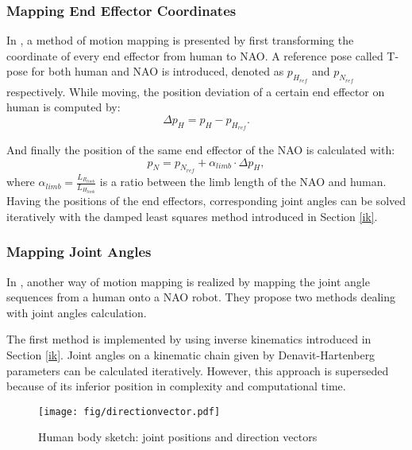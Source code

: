 \subsubsection{Mapping End Effector Coordinates}
In {\cite{koenemann2014real}}, a method of motion mapping is presented by first transforming the coordinate of every end effector from human to NAO. A reference pose called T-pose for both human and NAO is introduced, denoted as $ p_{H_{\mathit{ref}}} $ and $ p_{N_{\mathit{ref}}} $ respectively. While moving, the position deviation of a certain end effector on human is computed by:
\begin{equation}
\Delta p_{H} = p_{H} - p_{H_{\mathit{ref}}}.
\end{equation}

And finally the position of the same end effector of the NAO is calculated with:
\begin{equation}
p_N = p_{N_{\mathit{ref}}} + \alpha_{\mathit{limb}} \cdot\Delta p_H,
\end{equation}
where $ \alpha_{\mathit{limb}} =\frac{L_{R_{\mathit{limb}}}}{L_{H_{\mathit{limb}}}} $ is a ratio between the limb length of the NAO and human. Having the positions of the end effectors, corresponding joint angles can be solved iteratively with the damped least squares method introduced in Section {\ref{ik}}.

\subsubsection{Mapping Joint Angles}
\label{sectionmappingjointangle}
In {\cite{almetwally2013real}}, another way of motion mapping is realized by mapping the joint angle sequences from a human onto a NAO robot. They propose two methods dealing with joint angles calculation. 

The first method is implemented by using inverse kinematics introduced in Section {\ref{ik}}. Joint angles on a kinematic chain given by Denavit-Hartenberg parameters can be calculated iteratively. However, this approach is superseded because of its inferior position in complexity and computational time. 

\begin{figure}[H]
	\centering
	\texttt{[image: fig/directionvector.pdf]}
	\caption{Human body sketch: joint positions and direction vectors}
	\label{humansketch}
\end{figure}

